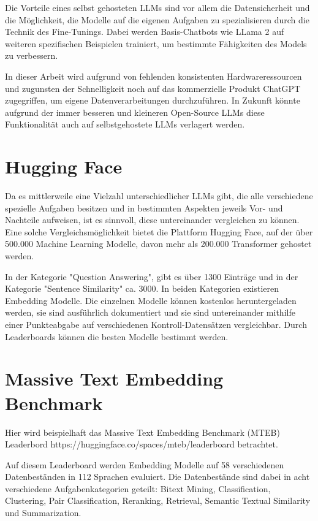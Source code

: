 Die Vorteile eines selbst gehosteten LLMs sind vor allem die Datensicherheit und die Möglichkeit, die Modelle auf die eigenen Aufgaben zu spezialisieren durch die Technik des Fine-Tunings.
Dabei werden Basis-Chatbots wie LLama 2 auf weiteren spezifischen Beispielen trainiert, um bestimmte Fähigkeiten des Models zu verbessern.

In dieser Arbeit wird aufgrund von fehlenden konsistenten Hardwareressourcen und zugunsten der Schnelligkeit noch auf das kommerzielle Produkt ChatGPT zugegriffen, um eigene Datenverarbeitungen durchzuführen.
In Zukunft könnte aufgrund der immer besseren und kleineren Open-Source LLMs diese Funktionalität auch auf selbstgehostete LLMs verlagert werden.

\section{Hugging Face}

Da es mittlerweile eine Vielzahl unterschiedlicher LLMs gibt, die alle verschiedene spezielle Aufgaben besitzen und in bestimmten Aspekten jeweils Vor- und Nachteile aufweisen, ist es sinnvoll, diese untereinander vergleichen zu können.
Eine solche Vergleichsmöglichkeit bietet die Plattform Hugging Face, auf der über 500.000 Machine Learning Modelle, davon mehr als 200.000 Transformer gehostet werden.

In der Kategorie "Question Answering", gibt es über 1300 Einträge und in der Kategorie "Sentence Similarity" ca. 3000.
In beiden Kategorien existieren Embedding Modelle.
Die einzelnen Modelle können kostenlos heruntergeladen werden, sie sind ausführlich dokumentiert und sie sind untereinander mithilfe einer Punkteabgabe auf verschiedenen Kontroll-Datensätzen vergleichbar.
Durch Leaderboards können die besten Modelle bestimmt werden.

\section{Massive Text Embedding Benchmark}

Hier wird beispielhaft das Massive Text Embedding Benchmark (MTEB) Leaderbord https://huggingface.co/spaces/mteb/leaderboard betrachtet.

Auf diesem Leaderboard werden Embedding Modelle auf 58 verschiedenen Datenbeständen in 112 Sprachen evaluiert.
Die Datenbestände sind dabei in acht verschiedene Aufgabenkategorien geteilt:
Bitext Mining, Classification, Clustering, Pair Classification, Reranking, Retrieval, Semantic Textual Similarity und Summarization.

